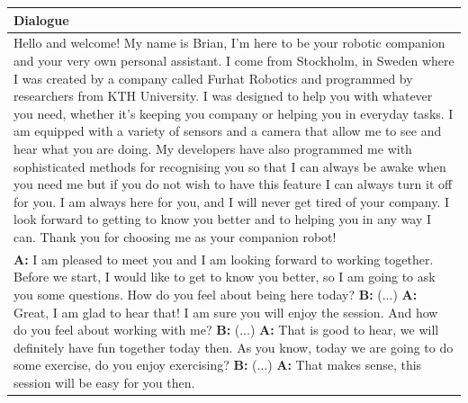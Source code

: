 \documentclass[nomenclature, english, biblatex]{kththesis}
\begin{document}
\begin{table}
    \centering
    \begin{adjustbox}{max width=\textwidth}
        \begin{tabular}{|p{\textwidth}|}
        \hline
        Dialogue\\
        \hline
        \hline
        Hello and welcome! My name is Brian, I’m here to be your robotic companion and your very own personal assistant. I come from Stockholm, in Sweden where I was created by a company called Furhat Robotics and programmed by researchers from KTH University. I was designed to help you with whatever you need, whether it’s keeping you company or helping you in everyday tasks. I am equipped with a variety of sensors and a camera that allow me to see and hear what you are doing. My developers have also programmed me with sophisticated methods for recognising you so that I can always be awake when you need me but if you do not wish to have this feature I can always turn it off for you. I am always here for you, and I will never get tired of your company. I look forward to getting to know you better and to helping you in any way I can. Thank you for choosing me as your companion robot!\\
        \hline
        \textbf{A:} I am pleased to meet you and I am looking forward to working together. Before we start, I would like to get to know you better, so I am going to ask you some questions. How do you feel about being here today?\newline
        \textbf{B:} (...)\newline
        \textbf{A:} Great, I am glad to hear that! I am sure you will enjoy the session. And how do you feel about working with me?\newline
        \textbf{B:} (...)\newline
        \textbf{A:} That is good to hear, we will definitely have fun together today then. As you know, today we are going to do some exercise, do you enjoy exercising? \newline
        \textbf{B:} (...)\newline
        \textbf{A:} That makes sense, this session will be easy for you then.\\
        \hline

\end{tabular}
\end{adjustbox}
\end{table}
\end{document}
